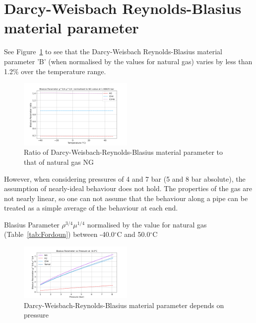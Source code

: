 \documentclass[5p]{elsarticle} %
\begin{document}
\section{Darcy-Weisbach Reynolds-Blasius material parameter}
\label{blasius2}
See Figure~\ref{fig:blasiusparam} to see that the Darcy-Weisbach Reynolds-Blasius material parameter 'B' (when normalised by the values for natural gas) varies by less than 1.2\% over the temperature range.
\begin{figure}[ht]
\centering
\includegraphics[width=0.49\textwidth]{peng_bf_NG.png}
\caption{Ratio of Darcy-Weisbach-Reynolds-Blasius material parameter  to that of natural gas NG }
\label{fig:blasiusparam}
\end{figure}
However, when considering pressures of 4 and 7 bar (5 and 8 bar absolute), the assumption of nearly-ideal behaviour does not hold. The properties of the gas are not nearly linear, so one can not assume that the behaviour along a pipe can be treated as a simple average of the behaviour at each end.



Blasius Parameter $\rho^{3/4}\mu^{1/4}$ normalised by the value for natural gas (Table~\ref{tab:Fordoun}) between -40.0$^\circ$C and 50.0$^\circ$C

\begin{figure}[htb]
\centering
\includegraphics[width=0.49\textwidth]{peng_bf_p.png}
\caption{Darcy-Weisbach-Reynolds-Blasius material parameter depends on pressure }
\label{fig:blasiuspressure}
\end{figure}
\end{document}
